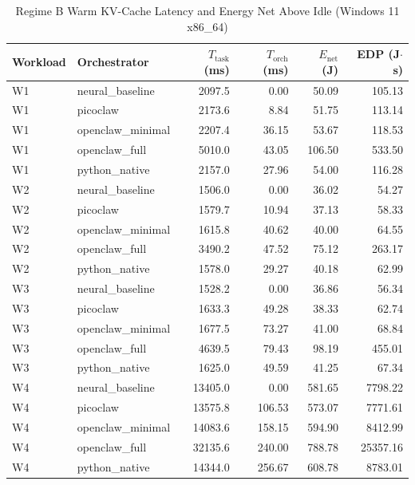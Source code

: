 \begin{table}[t]
\centering\small
\caption{Regime B Warm KV-Cache Latency and Energy Net Above Idle (Windows 11 x86_64)}
\label{tab:Windows_warm_cache}
\begin{tabular}{llrrrr}
\toprule
Workload & Orchestrator & $T_{\text{task}}$ (ms) & $T_{\text{orch}}$ (ms) & $E_{\text{net}}$ (J) & EDP (J$\cdot$s) \\
\midrule
W1 & neural\_baseline & 2097.5 & 0.00 & 50.09 & 105.13 \\
W1 & picoclaw & 2173.6 & 8.84 & 51.75 & 113.14 \\
W1 & openclaw\_minimal & 2207.4 & 36.15 & 53.67 & 118.53 \\
W1 & openclaw\_full & 5010.0 & 43.05 & 106.50 & 533.50 \\
W1 & python\_native & 2157.0 & 27.96 & 54.00 & 116.28 \\
W2 & neural\_baseline & 1506.0 & 0.00 & 36.02 & 54.27 \\
W2 & picoclaw & 1579.7 & 10.94 & 37.13 & 58.33 \\
W2 & openclaw\_minimal & 1615.8 & 40.62 & 40.00 & 64.55 \\
W2 & openclaw\_full & 3490.2 & 47.52 & 75.12 & 263.17 \\
W2 & python\_native & 1578.0 & 29.27 & 40.18 & 62.99 \\
W3 & neural\_baseline & 1528.2 & 0.00 & 36.86 & 56.34 \\
W3 & picoclaw & 1633.3 & 49.28 & 38.33 & 62.74 \\
W3 & openclaw\_minimal & 1677.5 & 73.27 & 41.00 & 68.84 \\
W3 & openclaw\_full & 4639.5 & 79.43 & 98.19 & 455.01 \\
W3 & python\_native & 1625.0 & 49.59 & 41.25 & 67.34 \\
W4 & neural\_baseline & 13405.0 & 0.00 & 581.65 & 7798.22 \\
W4 & picoclaw & 13575.8 & 106.53 & 573.07 & 7771.61 \\
W4 & openclaw\_minimal & 14083.6 & 158.15 & 594.90 & 8412.99 \\
W4 & openclaw\_full & 32135.6 & 240.00 & 788.78 & 25357.16 \\
W4 & python\_native & 14344.0 & 256.67 & 608.78 & 8783.01 \\
\bottomrule
\end{tabular}
\end{table}

